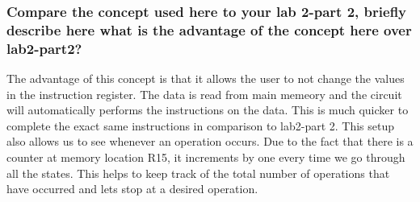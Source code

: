 \documentclass{article}
\begin{document}
	\subsubsection{Compare the concept used here to your lab 2-part 2, briefly describe here what is the advantage of the concept here over lab2-part2?}		
	The advantage of this concept is that it allows the user to not change the values in the instruction register.
	The data is read from main memeory and the circuit will automatically performs the instructions on the data.
	This is much quicker to complete the exact same instructions in comparison to lab2-part 2. 
	This setup also allows us to see whenever an operation occurs. 
	Due to the fact that there is a counter at memory location R15, it increments by one every time we go through all the states. 
	This helps to keep track of the total number of operations that have occurred and lets stop at a desired operation. 
\end{document}
